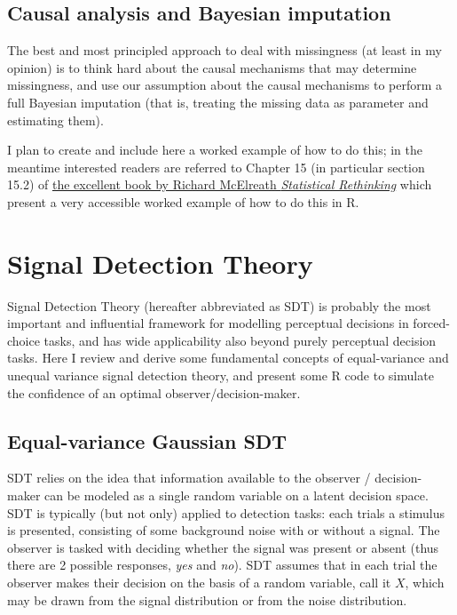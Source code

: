 \documentclass[
]{book}
\begin{document}
\section{Causal analysis and Bayesian imputation}\label{causal-analysis-and-bayesian-imputation}

The best and most principled approach to deal with missingness (at least in my opinion) is to think hard about the causal mechanisms that may determine missingness, and use our assumption about the causal mechanisms to perform a full Bayesian imputation (that is, treating the missing data as parameter and estimating them).

I plan to create and include here a worked example of how to do this; in the meantime interested readers are referred to Chapter 15 (in particular section 15.2) of \href{https://xcelab.net/rm/statistical-rethinking/}{the excellent book by Richard McElreath \emph{Statistical Rethinking}}\citep{statrethinking} which present a very accessible worked example of how to do this in R.

\chapter{Signal Detection Theory}\label{SDT}

Signal Detection Theory (hereafter abbreviated as SDT) is probably the most important and influential framework for modelling perceptual decisions in forced-choice tasks, and has wide applicability also beyond purely perceptual decision tasks. Here I review and derive some fundamental concepts of equal-variance and unequal variance signal detection theory, and present some R code to simulate the confidence of an optimal observer/decision-maker.

\section{Equal-variance Gaussian SDT}\label{equal-variance-gaussian-sdt}

SDT relies on the idea that information available to the observer / decision-maker can be modeled as a single random variable on a latent decision space. SDT is typically (but not only) applied to detection tasks: each trials a stimulus is presented, consisting of some background noise with or without a signal. The observer is tasked with deciding whether the signal was present or absent (thus there are 2 possible responses, \emph{yes} and \emph{no}). SDT assumes that in each trial the observer makes their decision on the basis of a random variable, call it \(X\), which may be drawn from the signal distribution or from the noise distribution.
\end{document}

